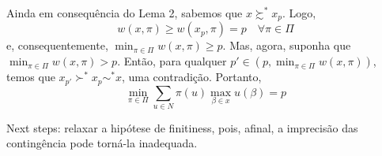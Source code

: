 \documentclass[11pt, a4paper]{article}
\theoremstyle{nonumberplain}
\theoremstyle{plain}
\theoremstyle{plain}
\begin{document}
Ainda em consequência do Lema 2, sabemos que $x\succsim^* x_p$. Logo, $$w(x,\pi)\geq w(x_p,\pi)=p\quad\forall\pi \in \Pi$$ e, consequentemente, $\min_{\pi\in\Pi}w(x,\pi)\geq p$. Mas, agora, suponha que $\min_{\pi\in\Pi}w(x,\pi)> p$. Então, para qualquer $p'\in (p,\min_{\pi\in\Pi}w(x,\pi))$, temos que $x_{p'}\succ^* x_p\sim^* x$, uma contradição. Portanto, $$\min_{\pi\in\Pi}\sum_{u\in N} \pi(u)\max_{\beta\in x}u(\beta)=p$$   

Next steps: relaxar a hipótese de finitiness, pois, afinal, a imprecisão das contingência pode torná-la inadequada. 


\end{document}

